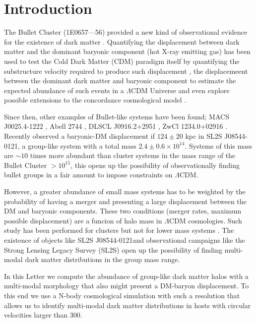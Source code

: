 \documentclass{emulateapj}
\newcommand{\hMsun}{{\ifmmode{h^{-1}{\rm {M_{\odot}}}}\else{$h^{-1}{\rm{M_{\odot}}}$}\fi}}
\newcommand{\Msun}{{\ifmmode{{\rm {M_{\odot}}}}\else{${\rm{M_{\odot}}}$}\fi}}
\newcommand{\kms}{{\ifmmode{{\mathrm{\,km\ s}^{-1}}}\else{\,km~s$^{-1}$}\fi}}
\newcommand{\bulla}{1E0657---56}
\newcommand{\bullg}{SL2S J08544-0121}
\begin{document}
\section{Introduction}


The Bullet Cluster (\bulla) provided a new
kind of observational evidence for the existence of dark matter
\citep{Markevitch2004,Clowe2006}. Quantifying the displacement between
dark matter and the dominant baryonic component (hot X-ray emitting gas)
has been used to test the Cold Dark Matter (CDM)
paradigm itself by quantifying the substructure velocity required to
produce such displacement \citep{Hayashi2006, Springel2007,
  Thompson2012}, the displacemeent between the dominant dark matter
and baryonic component \citep{ForeroRomero2010} to estimate the
expected abundance of such events in a $\Lambda$CDM Universe and even
explore possible extensions to the concordance cosmological model
\citep{Farrar2007,Lee2010,Lee2012}.    


Since then, other examples of Bullet-like systems have been found; 
MACS J0025.4-1222 \citep{Bradac2008}, Abell 2744 \citep{Merten2011},
DLSCL J0916.2+2951 \citep{Dawson2012}, ZwCl 1234.0+02916
\citep{Dahle2013}. Recently \citep{Gastaldello} observed a baryonic-DM
displacement if $124\pm 20$ kpc in \bullg, a group-like system with a total
mass $2.4\pm 0.6 \times 10^{14}$\Msun. Systems of this mass are
$\sim10$ times more abundant than cluster systems in the mass range of
the Bullet Cluster $>10^{15}$\hMsun, this opens up the possibility of
observationally finding bullet groups in a fair amount to impose
constraints on $\Lambda$CDM. 


However, a greater abundance of small mass systems has to be weighted
by the probability of having a merger and 
presenting a large displacement between the DM and baryonic
components. These two conditions (merger rates, maximum possible
displacement) are a funcion of halo mass in $\Lambda$CDM
cosmologies.  Such study has been performed for clusters but not for
lower mass systems \citep{ForeroRomero2010}. The existence of objects
like \bullg and observational campaigns like the Strong Lensing Legacy
Survey (SL2S) open up the possibility of finding multi-modal dark
matter distributions in the group mass range.


In this Letter we compute the abundance of group-like dark
matter halos with a multi-modal morphology that also might present a
DM-baryon displacement. To this end we use a N-body cosmological
simulation with such a resolution that allows us to identify
multi-modal dark matter distributions in hosts with circular velocities
larger than $300$\kms.  
\end{document}
